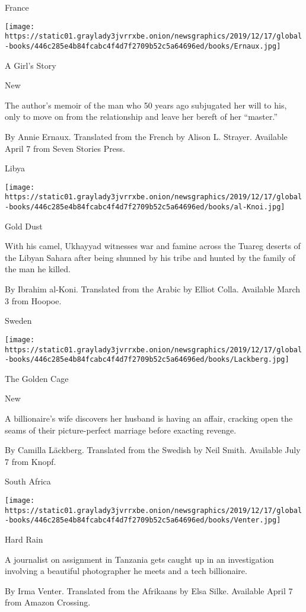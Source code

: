 France

\texttt{[image: https://static01.graylady3jvrrxbe.onion/newsgraphics/2019/12/17/global-books/446c285e4b84fcabc4f4d7f2709b52c5a64696ed/books/Ernaux.jpg]}

A Girl's Story

New

The author's memoir of the man who 50 years ago subjugated her will to
his, only to move on from the relationship and leave her bereft of her
``master.''

 By Annie Ernaux. Translated from the French by Alison L. Strayer.
Available April 7 from Seven Stories Press.

Libya

\texttt{[image: https://static01.graylady3jvrrxbe.onion/newsgraphics/2019/12/17/global-books/446c285e4b84fcabc4f4d7f2709b52c5a64696ed/books/al-Knoi.jpg]}

Gold Dust

With his camel, Ukhayyad witnesses war and famine across the Tuareg
deserts of the Libyan Sahara after being shunned by his tribe and hunted
by the family of the man he killed.

 By Ibrahim al-Koni. Translated from the Arabic by Elliot Colla.
Available March 3 from Hoopoe.

Sweden

\texttt{[image: https://static01.graylady3jvrrxbe.onion/newsgraphics/2019/12/17/global-books/446c285e4b84fcabc4f4d7f2709b52c5a64696ed/books/Lackberg.jpg]}

The Golden Cage

New

A billionaire's wife discovers her husband is having an affair, cracking
open the seams of their picture-perfect marriage before exacting
revenge.

 By Camilla Läckberg. Translated from the Swedish by Neil Smith.
Available July 7 from Knopf.

South Africa

\texttt{[image: https://static01.graylady3jvrrxbe.onion/newsgraphics/2019/12/17/global-books/446c285e4b84fcabc4f4d7f2709b52c5a64696ed/books/Venter.jpg]}

Hard Rain

A journalist on assignment in Tanzania gets caught up in an
investigation involving a beautiful photographer he meets and a tech
billionaire.

 By Irma Venter. Translated from the Afrikaans by Elsa Silke. Available
April 7 from Amazon Crossing.

